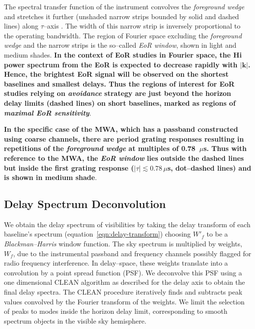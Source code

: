 \documentclass[preprint2,iop,numberedappendix,twocolappendix,appendixfloats]{emulateapj}
\begin{document}
The spectral transfer function of the instrument convolves the {\it foreground wedge} and stretches it further (unshaded narrow strips bounded by solid and dashed lines) along $\tau$--axis \citep{par12b,thy13}. The width of this narrow strip is inversely proportional to the operating bandwidth. The region of Fourier space excluding the {\it foreground wedge} and the narrow strips is the so--called {\it EoR window}, shown in light and medium shades. {\bf In the context of EoR studies in Fourier space, the H{\sc i} power spectrum from the EoR is expected to decrease rapidly with $|\boldsymbol{k}|$. Hence, the brightest EoR signal will be observed on the shortest baselines and smallest delays. Thus the regions of interest for EoR studies relying on {\it avoidance} strategy are just beyond the horizon delay limits (dashed lines) on short baselines, marked as regions of {\it maximal EoR sensitivity}}. 

{\bf In the specific case of the MWA, which has a passband constructed using coarse channels, there are period grating responses resulting in repetitions of the {\it foreground wedge} at multiples of 0.78~$\mu$s. Thus with reference to the MWA, the {\it EoR window} lies outside the dashed lines but inside the first grating response ($|\tau| \lesssim 0.78\,\mu$s, dot--dashed lines) and is shown in medium shade}.

\subsection{Delay Spectrum Deconvolution}\label{sec:data-delay-spectrum}

We obtain the delay spectrum of visibilities by taking the delay transform of each baseline's spectrum (equation~\ref{eqn:delay-transform}) choosing $W'_f$ to be a {\it Blackman--Harris} window function. The sky spectrum is multiplied by weights, $W_f$, due to the instrumental passband and frequency channels possibly flagged for radio frequency interference. In delay--space, these weights translate into a convolution by a point spread function (PSF). We deconvolve this PSF using a one dimensional CLEAN algorithm \citep{tay99} as described for the delay axis \citep{par09,par12b} to obtain the final delay spectra. The CLEAN procedure iteratively finds and subtracts peak values convolved by the Fourier transform of the weights. We limit the selection of peaks to modes inside the horizon delay limit, corresponding to smooth spectrum objects in the visible sky hemisphere. 
\end{document}
